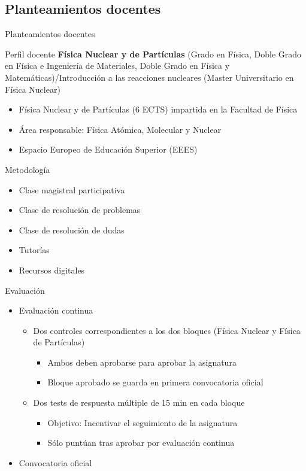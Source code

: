 \documentclass{beamer}
\begin{document}
\subsection{Planteamientos docentes}
\begin{frame}{Planteamientos docentes}
    \begin{block}{Perfil docente}
        \textbf{Física Nuclear y de Partículas} (Grado en Física, Doble Grado en Física e Ingeniería
de Materiales, Doble Grado en Física y Matemáticas)/Introducción a las reacciones
nucleares (Master Universitario en Física Nuclear)
    \end{block}
    \begin{itemize}
        \item Física Nuclear y de Partículas (6 ECTS) impartida en la Facultad de Física
        \item Área responsable: Física Atómica, Molecular y Nuclear
        \item Espacio Europeo de Educación Superior (EEES)
    \end{itemize}
\end{frame}

\begin{frame}{Metodología}
    \begin{itemize}
        \item Clase magistral participativa
        \item Clase de resolución de problemas
        \item Clase de resolución de dudas
        \item Tutorías
        \item Recursos digitales
    \end{itemize}
\end{frame}

\begin{frame}{Evaluación}
    \begin{itemize}
        \item Evaluación continua
        \begin{itemize}
        \item Dos controles correspondientes a los dos bloques (Física Nuclear y Física de Partículas)
        \begin{itemize}
        \item Ambos deben aprobarse para aprobar la asignatura
        \item Bloque aprobado se guarda en primera convocatoria oficial
        \end{itemize}
        \item Dos tests de respuesta múltiple de 15 min en cada bloque
        \begin{itemize}
        \item Objetivo: Incentivar el seguimiento de la asignatura
        \item Sólo puntúan tras aprobar por evaluación continua
        \end{itemize}         
        \end{itemize}
        \item Convocatoria oficial
    \end{itemize}
\end{frame}
\end{document}
